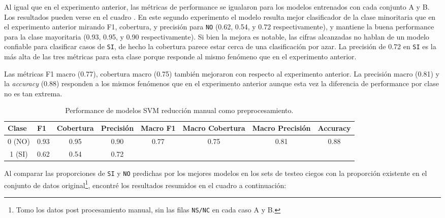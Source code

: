 \documentclass[10 pt]{article}
\begin{document}
Al igual que en el experimento anterior, las métricas de performance se igualaron para los modelos entrenados con cada conjunto A y B. Los resultados pueden verse en el cuadro . En este segundo experimento el modelo resulta mejor clasificador de la clase minoritaria que en el experimento anterior mirando F1, cobertura, y precisión para \texttt{NO} (0.62, 0.54, y 0.72 respectivamente), y mantiene la buena performance para la clase mayoritaria (0.93, 0.95, y 0.90 respectivamente). Si bien la mejora es notable, las cifras alcanzadas no hablan de un modelo confiable para clasificar casos de \texttt{SI}, de hecho la cobertura parece estar cerca de una clasificación por azar. La precisión de 0.72 en \texttt{SI} es la más alta de las tres métricas para esta clase porque responde al mismo fenómeno que en el experimento anterior.


Las métricas F1 macro (0.77), cobertura macro (0.75) también mejoraron con respecto al experimento anterior. La precisión macro (0.81) y la \textit{accuracy} (0.88) responden a los mismos fenómenos que en el experimento anterior aunque esta vez la diferencia de performance por clase no es tan extrema.

\begin{table}[H]
    \centering
    \small
    \caption{Performance de modelos SVM reducción manual como preprocesamiento.}
    \label{svmperfomanual}
    \begin{tabular}{cccccccc}
    \hline
    \multicolumn{1}{l}{\textbf{Clase}} & \multicolumn{1}{l}{\textbf{F1}} & \multicolumn{1}{l}{\textbf{Cobertura}} & \multicolumn{1}{l}{\textbf{Precisión}} & \multicolumn{1}{l}{\textbf{Macro F1}} & \multicolumn{1}{l}{\textbf{Macro Cobertura}} & \multicolumn{1}{l}{\textbf{Macro Precisión}} & \multicolumn{1}{l}{\textbf{Accuracy}} \\ \hline
    0 (NO) & 0.93 & 0.95 & 0.90 & \multirow{2}{*}{0.77} & \multirow{2}{*}{0.75} & \multirow{2}{*}{0.81} & \multirow{2}{*}{0.88} \\
    1 (SI) & 0.62 & 0.54 & 0.72 &  &  &  &  \\ \hline
    \end{tabular}
    \end{table}


Al comparar las proporciones de \texttt{SI} y \texttt{NO} predichas por los mejores modelos en los sets de testeo ciegos con la proporción existente en el conjunto de datos original\footnote{Tomo los datos post procesamiento manual, sin las filas \texttt{NS/NC} en cada caso A y B.}, encontré los resultados resumidos en el cuadro a continuación:
\end{document}
